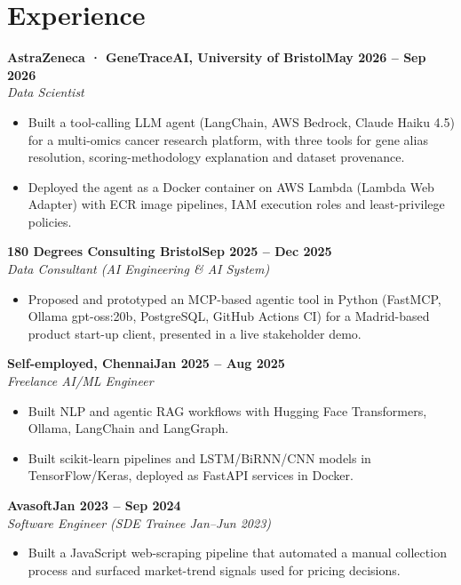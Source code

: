 \documentclass[a4paper,10pt]{article}
\newcommand{\entry}[4]{\noindent\textbf{#1}\hfill\textbf{#2}\\ \textit{#3}\hfill\textit{#4}\par}
\begin{document}
\section{Experience}
\entry{AstraZeneca · GeneTraceAI, University of Bristol}{May 2026 – Sep 2026}{Data Scientist}{}
\begin{itemize}
  \item Built a tool-calling LLM agent (LangChain, AWS Bedrock, Claude Haiku 4.5) for a multi-omics cancer research platform, with three tools for gene alias resolution, scoring-methodology explanation and dataset provenance.
  \item Deployed the agent as a Docker container on AWS Lambda (Lambda Web Adapter) with ECR image pipelines, IAM execution roles and least-privilege policies.
\end{itemize}
\vspace{3pt}
\entry{180 Degrees Consulting Bristol}{Sep 2025 – Dec 2025}{Data Consultant (AI Engineering \& AI System)}{}
\begin{itemize}
  \item Proposed and prototyped an MCP-based agentic tool in Python (FastMCP, Ollama gpt-oss:20b, PostgreSQL, GitHub Actions CI) for a Madrid-based product start-up client, presented in a live stakeholder demo.
\end{itemize}
\vspace{3pt}
\entry{Self-employed, Chennai}{Jan 2025 – Aug 2025}{Freelance AI/ML Engineer}{}
\begin{itemize}
  \item Built NLP and agentic RAG workflows with Hugging Face Transformers, Ollama, LangChain and LangGraph.
  \item Built scikit-learn pipelines and LSTM/BiRNN/CNN models in TensorFlow/Keras, deployed as FastAPI services in Docker.
\end{itemize}
\vspace{3pt}
\entry{Avasoft}{Jan 2023 – Sep 2024}{Software Engineer (SDE Trainee Jan–Jun 2023)}{}
\begin{itemize}
  \item Built a JavaScript web-scraping pipeline that automated a manual collection process and surfaced market-trend signals used for pricing decisions.
\end{itemize}

\end{document}
